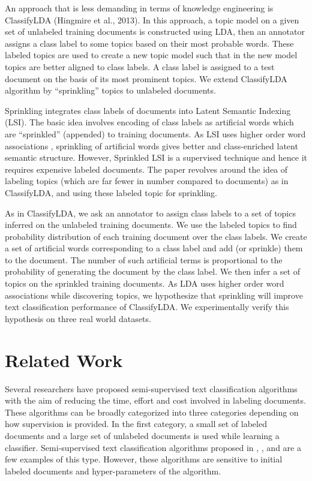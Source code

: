 \documentclass[11pt]{article}
\begin{document}
An approach that is less demanding in terms of knowledge engineering is ClassifyLDA (Hingmire et al., 2013). In this approach, a topic model on a given set of unlabeled training documents is constructed using LDA, then an annotator assigns a class label to some topics based on their most probable words. These labeled topics are used to create a new topic model such that in the new model topics are better aligned to class labels. A class label is assigned to a test document on the basis of its most prominent topics. We extend ClassifyLDA algorithm by ``sprinkling'' topics to unlabeled documents.

Sprinkling \cite{DBLP:conf/ecir/ChakrabortiLWW06} integrates class labels of documents into Latent Semantic Indexing (LSI)\cite{Deerwester:Indexing}. The basic idea involves encoding of class labels as artificial words which are ``sprinkled'' (appended) to training documents. As LSI uses higher order word associations \cite{Kontostathis:2006:FUL:1138797.1138801}, sprinkling of artificial words gives better and class-enriched latent semantic structure. However, Sprinkled LSI is a supervised technique and hence it requires expensive labeled documents. The paper revolves around the idea of labeling topics (which are far fewer in number compared to documents) as in ClassifyLDA, and using these labeled topic for sprinkling. 
    
As in ClassifyLDA, we ask an annotator to assign class labels to a set of topics inferred on the unlabeled training documents. We use the labeled topics to find probability distribution of each training document over the class labels. We create a set of artificial words corresponding to a class label and add (or sprinkle) them to the document. The number of such artificial terms is proportional to the probability of generating the document by the class label. We then infer a set of topics on the sprinkled training documents. As LDA uses higher order word associations \cite{Lee:2010:ECF:1748111.1748318} while discovering topics, we hypothesize that sprinkling will improve text classification performance of ClassifyLDA. We experimentally verify this hypothesis on three real world datasets.
\section{Related Work}\label{Sec:BG_RW}
Several researchers have proposed semi-supervised text classification algorithms with the aim of reducing  the time, effort and cost involved in labeling documents. These algorithms can be broadly categorized into three categories depending on how supervision is provided. In the first category, a small set of labeled documents and a large set of unlabeled documents is used while learning a classifier. Semi-supervised text classification algorithms proposed in \cite{Nigam:Text}, \cite{Joachims:1999:TIT:645528.657646}, \cite{Zhu02learningfrom} and \cite{Blum:1998:CLU:279943.279962} are a few examples of this type. However, these algorithms are sensitive to initial labeled documents and hyper-parameters of the algorithm.
\end{document}
